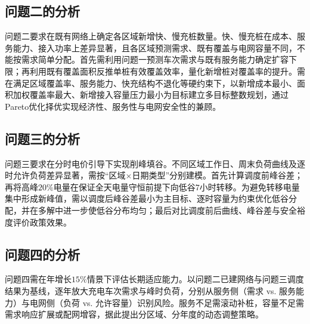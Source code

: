 \documentclass[a4paper,12pt]{ctexart}
\begin{document}
\subsection{问题二的分析}
问题二要求在既有网络上确定各区域新增快、慢充桩数量。快、慢充桩在成本、服务能力、接入功率上差异显著，且各区域预测需求、既有覆盖与电网容量不同，不能按需求简单分配。首先需利用问题一预测车次需求与既有服务能力确定扩容下限；再利用既有覆盖面积反推单桩有效覆盖效率，量化新增桩对覆盖率的提升。需在满足区域覆盖率、服务能力、快充结构不退化等硬约束下，以新增成本最小、面积加权覆盖率最大、新增接入容量压力最小为目标建立多目标整数规划，通过Pareto优化择优实现经济性、服务性与电网安全性的兼顾。

\subsection{问题三的分析}
问题三要求在分时电价引导下实现削峰填谷。不同区域工作日、周末负荷曲线及逐时允许负荷差异显著，需按“区域$\times$日期类型”分别建模。首先计算调度前峰谷差；再将高峰$20\%$电量在保证全天电量守恒前提下向低谷$7$小时转移。为避免转移电量集中形成新峰值，需以调度后峰谷差最小为主目标、逐时容量为约束优化低谷分配，并在多解中进一步使低谷分布均匀；最后对比调度前后曲线、峰谷差与安全裕度评价政策效果。

\subsection{问题四的分析}
问题四需在年增长$15\%$情景下评估长期适应能力。以问题二已建网络与问题三调度结果为基线，逐年放大充电车次需求与峰时负荷，分别从服务侧（需求 vs. 服务能力）与电网侧（负荷 vs. 允许容量）识别风险。服务不足需滚动补桩，容量不足需需求响应扩展或配网增容，据此提出分区域、分年度的动态调整策略。

\end{document}
